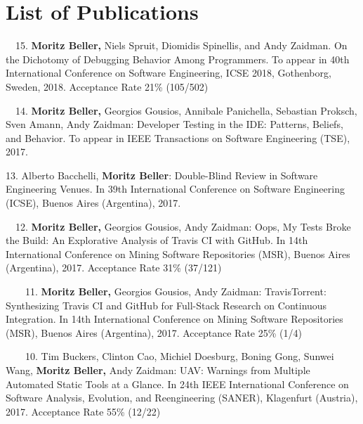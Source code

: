 \chapter*{List of Publications}
\label{publications}

\begin{etaremune}{\small
\item[\faFileTextO~~15.] \textbf{Moritz Beller,} Niels Spruit, Diomidis Spinellis, and Andy
  Zaidman. On the Dichotomy of Debugging Behavior Among Programmers. To appear in 40th
  International Conference on Software Engineering, ICSE 2018, Gothenborg, Sweden, 2018. Acceptance
  Rate 21\% (105/502)

\item[\faFileTextO~~14.] \textbf{Moritz Beller,} Georgios Gousios, Annibale Panichella, Sebastian
  Proksch, Sven Amann, Andy Zaidman: Developer Testing in the IDE: Patterns, Beliefs, and
  Behavior. To appear in IEEE Transactions on Software Engineering (TSE), 2017.

\item[13.] Alberto Bacchelli, \textbf{Moritz Beller}: Double-Blind Review in Software Engineering
  Venues. In 39th International Conference on Software Engineering (ICSE), Buenos Aires
  (Argentina), 2017.

\item[\faFileTextO~~12.] \textbf{Moritz Beller,} Georgios Gousios, Andy Zaidman: Oops, My Tests
  Broke the Build: An Explorative Analysis of Travis CI with GitHub. In 14th International
  Conference on Mining Software Repositories (MSR), Buenos Aires (Argentina), 2017.  Acceptance
  Rate 31\% (37/121)

\item[\faTrophy~~\faFileTextO~~11.] \textbf{Moritz Beller,} Georgios Gousios, Andy Zaidman:
  TravisTorrent: Synthesizing Travis CI and GitHub for Full-Stack Research on Continuous
  Integration. In 14th International Conference on Mining Software Repositories (MSR), Buenos Aires
  (Argentina), 2017.  Acceptance Rate 25\% (1/4)

\item[\faTrophy~~\faFileTextO~~10.] Tim Buckers, Clinton Cao, Michiel Doesburg, Boning Gong, Sunwei
  Wang, \textbf{Moritz Beller,} Andy Zaidman: UAV: Warnings from Multiple Automated Static Tools at
  a Glance. In 24th IEEE International Conference on Software Analysis, Evolution, and
  Reengineering (SANER), Klagenfurt (Austria), 2017.  Acceptance Rate 55\% (12/22)

}
\end{etaremune}
